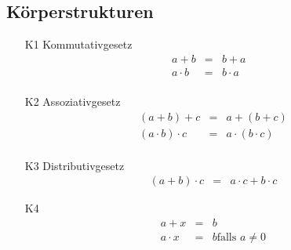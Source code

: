 \subsection{Körperstrukturen}
\begin{itemize}
  \item[K1] Kommutativgesetz
  \begin{align*}
    a+b &=& b + a &\\
    a\cdot b &=& b\cdot a &\\
  \end{align*}
  \item[K2] Assoziativgesetz
    \begin{align*}
      (a+b)+c &=&a+(b+c)\\
      (a\cdot b)\cdot c&=&a\cdot(b\cdot c)\\
    \end{align*}
  \item[K3] Distributivgesetz
    \begin{align*}
      (a+b)\cdot c&=& a\cdot c + b\cdot c
    \end{align*}
  \item[K4] 
    \begin{align*}
      a+x&=&b\\
      a\cdot x&=&b \text{falls $a\neq 0$}\\
    \end{align*}
\end{itemize}
